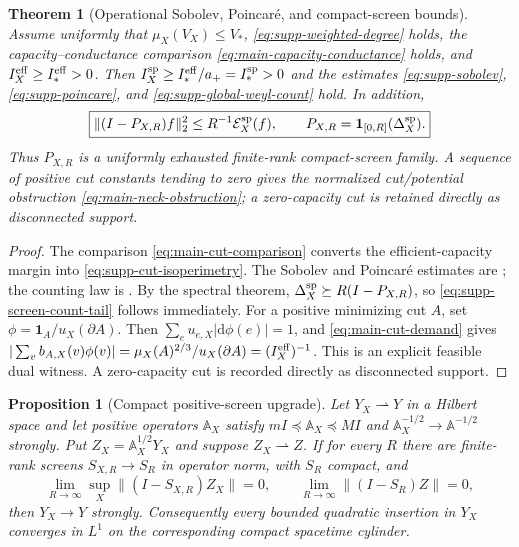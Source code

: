 \documentclass[11pt]{article}
\newtheorem{theorem}{Theorem}[section]
\newtheorem{proposition}[proposition]{Proposition}
\theoremstyle{definition}
\theoremstyle{remark}
\newcommand{\one}{\mathbf 1}
\newcommand{\dd}{\mathrm d}
\begin{document}
\begin{theorem}[Operational Sobolev, Poincar\'e, and compact-screen bounds]
\label{thm:supp-spatial-screen}
Assume uniformly that $\mu_X(V_X)\le V_*$,
\eqref{eq:supp-weighted-degree} holds, the capacity--conductance comparison
\eqref{eq:main-capacity-conductance} holds, and
$I_X^{\rm eff}\ge I_*^{\rm eff}>0$.  Then
$I_X^{\rm sp}\ge I_*^{\rm eff}/a_+=I_*^{\rm sp}>0$ and the estimates
\eqref{eq:supp-sobolev}, \eqref{eq:supp-poincare}, and
\eqref{eq:supp-global-weyl-count} hold.  In addition,
\begin{equation}
 \boxed{
 \|(I-P_{X,R})f\|_2^2
 \le R^{-1}\mathcal E_X^{\rm sp}(f),
 \qquad P_{X,R}=\one_{[0,R]}(\Delta_X^{\rm sp}).}
 \label{eq:supp-screen-count-tail}
\end{equation}
Thus $P_{X,R}$ is a uniformly exhausted finite-rank compact-screen family.
A sequence of positive cut constants tending to zero gives the normalized
cut/potential obstruction \eqref{eq:main-neck-obstruction}; a zero-capacity
cut is retained directly as disconnected support.
\end{theorem}

\begin{proof}
The comparison \eqref{eq:main-cut-comparison} converts the efficient-capacity
margin into \eqref{eq:supp-cut-isoperimetry}.  The Sobolev and Poincar\'e
estimates are ; the counting law is
.  By the spectral theorem,
$\Delta_X^{\rm sp}\succeq R(I-P_{X,R})$, so
\eqref{eq:supp-screen-count-tail} follows immediately.  For a positive minimizing cut $A$, set
$\phi=\one_A/u_X(\partial A)$.  Then
$\sum_eu_{e,X}|\dd\phi(e)|=1$, and \eqref{eq:main-cut-demand} gives
$|\sum_vb_{A,X}(v)\phi(v)|=\mu_X(A)^{2/3}/u_X(\partial A)
=(I_X^{\rm eff})^{-1}$.  This is an explicit feasible dual witness.
A zero-capacity cut is recorded directly as disconnected support.
\end{proof}

\begin{proposition}[Compact positive-screen upgrade]
\label{prop:supp-compact-upgrade}
Let $Y_X\rightharpoonup Y$ in a Hilbert space and let positive operators
$\mathbb A_X$ satisfy
$mI\preceq\mathbb A_X\preceq MI$ and
$\mathbb A_X^{-1/2}\to\mathbb A^{-1/2}$ strongly.  Put
$Z_X=\mathbb A_X^{1/2}Y_X$ and suppose $Z_X\rightharpoonup Z$.  If for every
$R$ there are finite-rank screens $S_{X,R}\to S_R$ in operator norm, with
$S_R$ compact, and
\[
 \lim_{R\to\infty}\sup_X\|(I-S_{X,R})Z_X\|=0,
 \qquad
 \lim_{R\to\infty}\|(I-S_R)Z\|=0,
\]
then $Y_X\to Y$ strongly.  Consequently every bounded quadratic insertion in
$Y_X$ converges in $L^1$ on the corresponding compact spacetime cylinder.
\end{proposition}
\end{document}

